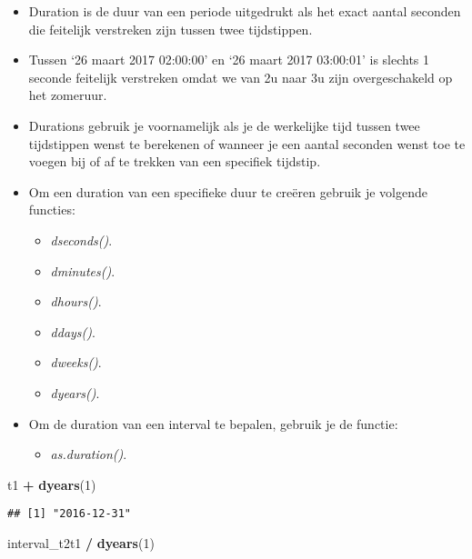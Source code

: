 \documentclass[]{memoir}
\newenvironment{Shaded}{\begin{snugshade}}{\end{snugshade}}
\newcommand{\DecValTok}[1]{\textcolor[rgb]{0.00,0.00,0.81}{#1}}
\newcommand{\KeywordTok}[1]{\textcolor[rgb]{0.13,0.29,0.53}{\textbf{#1}}}
\newcommand{\NormalTok}[1]{#1}
\newcommand{\OperatorTok}[1]{\textcolor[rgb]{0.81,0.36,0.00}{\textbf{#1}}}
\newcommand{\StringTok}[1]{\textcolor[rgb]{0.31,0.60,0.02}{#1}}
\providecommand{\tightlist}{%
  \setlength{\itemsep}{0pt}\setlength{\parskip}{0pt}}
\begin{document}
\begin{itemize}
\tightlist
\item
  Duration is de duur van een periode uitgedrukt als het exact aantal seconden die feitelijk verstreken zijn tussen twee tijdstippen.
\item
  Tussen `26 maart 2017 02:00:00' en `26 maart 2017 03:00:01' is slechts 1 seconde feitelijk verstreken omdat we van 2u naar 3u zijn overgeschakeld op het zomeruur.
\item
  Durations gebruik je voornamelijk als je de werkelijke tijd tussen twee tijdstippen wenst te berekenen of wanneer je een aantal seconden wenst toe te voegen bij of af te trekken van een specifiek tijdstip.
\item
  Om een duration van een specifieke duur te creëren gebruik je volgende functies:

  \begin{itemize}
  \tightlist
  \item
    \emph{dseconds()}.
  \item
    \emph{dminutes()}.
  \item
    \emph{dhours()}.
  \item
    \emph{ddays()}.
  \item
    \emph{dweeks()}.
  \item
    \emph{dyears()}.
  \end{itemize}
\item
  Om de duration van een interval te bepalen, gebruik je de functie:

  \begin{itemize}
  \tightlist
  \item
    \emph{as.duration()}.
  \end{itemize}
\end{itemize}

\begin{Shaded}
\begin{Highlighting}[]
\NormalTok{t1 }\OperatorTok{+}\StringTok{ }\KeywordTok{dyears}\NormalTok{(}\DecValTok{1}\NormalTok{)}
\end{Highlighting}
\end{Shaded}

\begin{verbatim}
## [1] "2016-12-31"
\end{verbatim}

\begin{Shaded}
\begin{Highlighting}[]
\NormalTok{interval_t2t1 }\OperatorTok{/}\StringTok{ }\KeywordTok{dyears}\NormalTok{(}\DecValTok{1}\NormalTok{)}
\end{Highlighting}
\end{Shaded}
\end{document}
